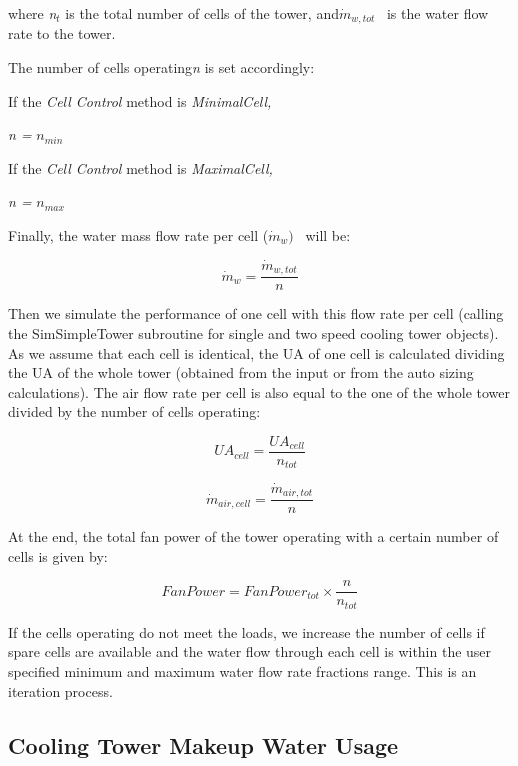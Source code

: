 where \emph{n\(_{t}\)} is the total number of cells of the tower, and\({{{\dot m}_{w,tot}}}\) ~is the water flow rate to the tower.

The number of cells operating\emph{n} is set accordingly:

If the \emph{Cell Control} method is \emph{MinimalCell,}

\emph{n =} \({{n_{min}}}\)

If the \emph{Cell Control} method is \emph{MaximalCell,}

\emph{n =} \({{n_{max}}}\)

Finally, the water mass flow rate per cell (\({{\dot m}_w})\) ~will be:

\begin{equation}
{{\dot m}_w} = \frac{{{{\dot m}_{w,tot}}}}{n}
\end{equation}

Then we simulate the performance of one cell with this flow rate per cell (calling the SimSimpleTower subroutine for single and two speed cooling tower objects). As we assume that each cell is identical, the UA of one cell is calculated dividing the UA of the whole tower (obtained from the input or from the auto sizing calculations). The air flow rate per cell is also equal to the one of the whole tower divided by the number of cells operating:

\begin{equation}
U{A_{cell}} = \frac{{U{A_{cell}}}}{{{n_{tot}}}}
\end{equation}

\begin{equation}
{\dot m_{air,cell}} = \frac{{{{\dot m}_{air,tot}}}}{n}
\end{equation}

At the end, the total fan power of the tower operating with a certain number of cells is given by:

\begin{equation}
FanPower = FanPowe{r_{tot}} \times \frac{n}{{{n_{tot}}}}
\end{equation}

If the cells operating do not meet the loads, we increase the number of cells if spare cells are available and the water flow through each cell is within the user specified minimum and maximum water flow rate fractions range. This is an iteration process.

\subsection{Cooling Tower Makeup Water Usage}\label{cooling-tower-makeup-water-usage-1}


